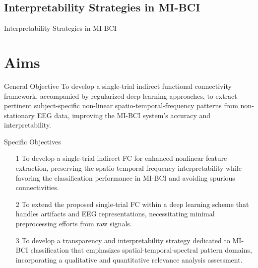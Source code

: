 \documentclass[aspectratio=169]{beamer}
\begin{document}
\subsection{Interpretability Strategies in MI-BCI}

\begin{frame}{Interpretability Strategies in MI-BCI}
    \begin{figure}[!ht]
        \centering
    \end{figure}
\end{frame}

\section{Aims}

\begin{frame}{General Objective}
    To develop a single-trial indirect functional connectivity framework, accompanied by regularized deep learning approaches, to extract pertinent subject-specific non-linear spatio-temporal-frequency patterns from non-stationary EEG data, improving the MI-BCI system's accuracy and interpretability.
\end{frame}

\begin{frame}{Specific Objectives}
\centering
\begin{itemize}
    \setlength\itemsep{2em}
	\item[1] To develop a single-trial indirect FC for enhanced nonlinear feature extraction, preserving the spatio-temporal-frequency interpretability while favoring the classification performance in MI-BCI and avoiding spurious connectivities.
 
	\item[2] To extend the proposed single-trial FC within a deep learning scheme that handles artifacts and EEG representations, necessitating minimal preprocessing efforts from raw signals.
 
	\item[3] To develop a transparency and interpretability strategy dedicated to MI-BCI classification that emphasizes spatial-temporal-spectral pattern domains, incorporating a qualitative and quantitative relevance analysis assessment.
\end{itemize}
\end{frame}
\end{document}
